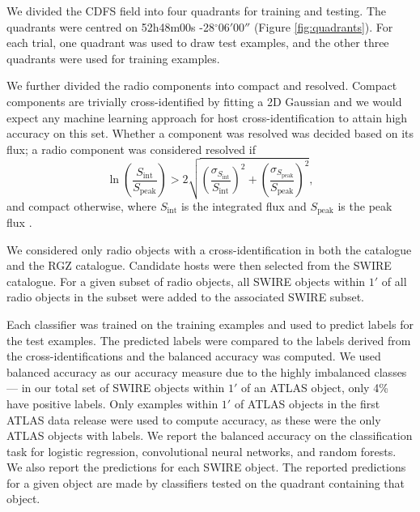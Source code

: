\documentclass[fleqn,usenatbib,usedcolumn]{mnras}
\newcommand{\text}{\mathrm}
\begin{document}
    We divided the CDFS field into four quadrants for training and testing.
    The quadrants were centred on 52h48m00s -28$^\circ$06$'$00$''$
    (Figure \ref{fig:quadrants}). For each trial, one quadrant
    was used to draw test examples, and the other three quadrants were used
    for training examples.

    We further divided the radio components into compact and resolved. Compact
    components are trivially cross-identified by fitting a 2D Gaussian \citep[as
    in][]{norris06} and we would expect any machine learning approach for host
    cross-identification to attain high accuracy on this set. Whether a
    component was resolved was decided based on its flux; a radio component
    was considered resolved if
    \[
        \ln \left(
          \frac{S_{\text{int}}}
               {S_{\text{peak}}}
        \right) > 2\sqrt{\left(
          \frac{\sigma_{S_{\text{int}}}}
               {S_{\text{int}}}
        \right)^2 + \left(
          \frac{\sigma_{S_{\text{peak}}}}
               {S_{\text{peak}}}
        \right)^2},
    \] and compact otherwise, where \(S_{\text{int}}\) is the integrated
    flux and \(S_{\text{peak}}\) is the peak flux \citep{franzen15}.

    We considered only radio objects with a cross-identification in both the
    \citet{norris06} catalogue and the RGZ catalogue. Candidate hosts
    were then selected from the SWIRE catalogue. For a given subset of radio
    objects, all SWIRE objects within $1'$ of all radio objects in the
    subset were added to the associated SWIRE subset.

    Each classifier was trained on the training examples and used to predict
    labels for the test examples. The predicted labels were compared to the
    labels derived from the \citet{norris06} cross-identifications and the
    balanced accuracy was computed. We used balanced accuracy as our accuracy
    measure due to the highly imbalanced classes --- in our total set of SWIRE
    objects within $1'$ of an ATLAS object, only 4\% have positive labels.
    Only examples within $1'$ of ATLAS objects in the first ATLAS data release
    \citep{norris06} were used to compute accuracy, as these were the only
    ATLAS objects with \citet{norris06} labels. We report the balanced
    accuracy on the classification task for logistic regression, convolutional
    neural networks, and random forests. We also report the predictions for
    each SWIRE object. The reported predictions for a given object are made by
    classifiers tested on the quadrant containing that object.
\end{document}
